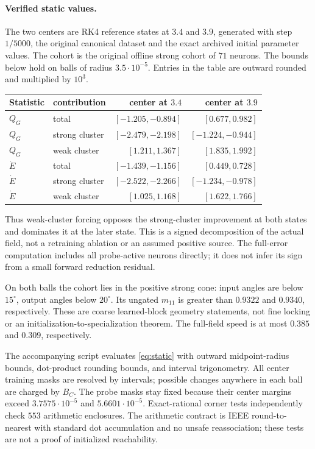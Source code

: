 \paragraph{Verified static values.}
The two centers are RK4 reference states at $3.4$ and $3.9$, generated with
step $1/5000$, the original canonical dataset and the exact archived initial
parameter values. The cohort is the original offline strong cohort of
$71$ neurons. The bounds below hold on balls of radius $3.5\cdot10^{-5}$.
Entries in the table are outward rounded and multiplied by $10^3$.
\begin{center}
\begin{tabular}{llrr}
\toprule
Statistic & contribution & center at $3.4$ & center at $3.9$\\
\midrule
$Q_G$ & total & $[-1.205,-0.894]$ & $[0.677,0.982]$\\
$Q_G$ & strong cluster & $[-2.479,-2.198]$ & $[-1.224,-0.944]$\\
$Q_G$ & weak cluster & $[1.211,1.367]$ & $[1.835,1.992]$\\
$\dot E$ & total & $[-1.439,-1.156]$ & $[0.449,0.728]$\\
$\dot E$ & strong cluster & $[-2.522,-2.266]$ & $[-1.234,-0.978]$\\
$\dot E$ & weak cluster & $[1.025,1.168]$ & $[1.622,1.766]$\\
\bottomrule
\end{tabular}
\end{center}
Thus weak-cluster forcing opposes the strong-cluster improvement at both
states and dominates it at the later state. This is a signed decomposition
of the actual field, not a retraining ablation or an assumed positive source.
The full-error computation includes all probe-active neurons directly;
it does not infer its sign from a small forward reduction residual.

On both balls the cohort lies in the positive strong cone: input angles
are below $15^\circ$, output angles below $20^\circ$. Its ungated
$m_{11}$ is greater than $0.9322$ and $0.9340$, respectively.
These are coarse learned-block geometry statements, not fine locking or
an initialization-to-specialization theorem. The full-field speed is at most
$0.385$ and $0.309$, respectively.

The accompanying script evaluates \eqref{eq:static} with outward
midpoint-radius bounds, dot-product rounding bounds, and interval
trigonometry. All center training masks are resolved by intervals; possible
changes anywhere in each ball are charged by $B_C$. The probe masks stay
fixed because their center margins exceed $3.7575\cdot10^{-5}$ and
$5.6601\cdot10^{-5}$. Exact-rational corner tests independently check
$553$ arithmetic enclosures. The arithmetic contract is IEEE
round-to-nearest with standard dot accumulation and no unsafe reassociation;
these tests are not a proof of initialized reachability.
